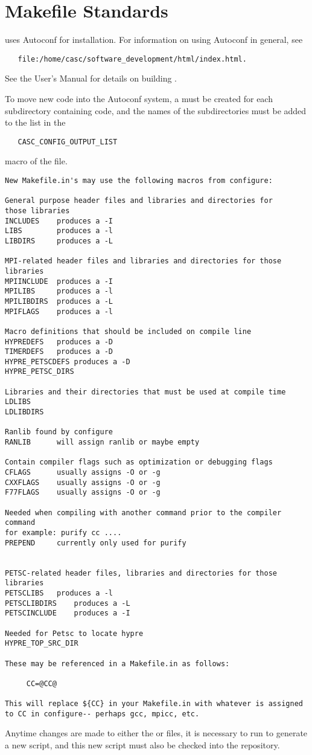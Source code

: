 \chapter{Makefile Standards}
\label{Makefile Standards}

\hypre{} uses Autoconf for installation.  For information on using
Autoconf in general, see
\begin{verbatim}
   file:/home/casc/software_development/html/index.html.
\end{verbatim}
See the User's Manual for details on building \hypre{}.

To move new code into the Autoconf system, a  must be
created for each subdirectory containing code, and the names of the
subdirectories must be added to the list in the
\begin{verbatim}
   CASC_CONFIG_OUTPUT_LIST
\end{verbatim}
macro of the  file.

\begin{verbatim}
New Makefile.in's may use the following macros from configure:

General purpose header files and libraries and directories for
those libraries 
INCLUDES  	produces a -I
LIBS		produces a -l
LIBDIRS		produces a -L

MPI-related header files and libraries and directories for those libraries
MPIINCLUDE	produces a -I
MPILIBS		produces a -l
MPILIBDIRS	produces a -L
MPIFLAGS	produces a -l

Macro definitions that should be included on compile line
HYPREDEFS	produces a -D
TIMERDEFS	produces a -D
HYPRE_PETSCDEFS produces a -D
HYPRE_PETSC_DIRS 

Libraries and their directories that must be used at compile time 
LDLIBS
LDLIBDIRS

Ranlib found by configure
RANLIB		will assign ranlib or maybe empty

Contain compiler flags such as optimization or debugging flags
CFLAGS		usually assigns -O or -g
CXXFLAGS	usually assigns -O or -g
F77FLAGS	usually assigns -O or -g

Needed when compiling with another command prior to the compiler command
for example: purify cc ....
PREPEND 	currently only used for purify


PETSC-related header files, libraries and directories for those libraries
PETSCLIBS	produces a -l
PETSCLIBDIRS	produces a -L
PETSCINCLUDE 	produces a -I

Needed for Petsc to locate hypre
HYPRE_TOP_SRC_DIR 

These may be referenced in a Makefile.in as follows:
  
	 CC=@CC@

This will replace ${CC} in your Makefile.in with whatever is assigned
to CC in configure-- perhaps gcc, mpicc, etc.

\end{verbatim}

Anytime changes are made to either the  or
 files, it is necessary to run  to
generate a new  script, and this new script must also
be checked into the repository.

